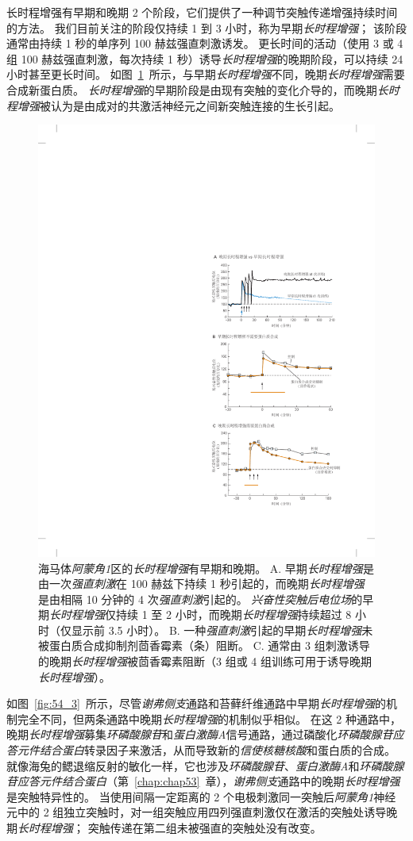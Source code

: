 长时程增强有早期和晚期 2 个阶段，它们提供了一种调节突触传递增强持续时间的方法。
我们目前关注的阶段仅持续 1 到 3 小时，称为早期\textit{长时程增强}；
该阶段通常由持续 1 秒的单序列 100 赫兹强直刺激诱发。
更长时间的活动（使用 3 或 4 组 100 赫兹强直刺激，每次持续 1 秒）诱导\textit{长时程增强}的晚期阶段，可以持续 24 小时甚至更长时间。
如图~\ref{fig:54_5}~所示，与早期\textit{长时程增强}不同，晚期\textit{长时程增强}需要合成新蛋白质。
\textit{长时程增强}的早期阶段是由现有突触的变化介导的，而晚期\textit{长时程增强}被认为是由成对的共激活神经元之间新突触连接的生长引起。


\begin{figure}[htbp]
	\centering
	\includegraphics[width=0.65\linewidth]{chap54/fig_54_5}
	\caption{海马体\textit{阿蒙角1}区的\textit{长时程增强}有早期和晚期。
		A. 早期\textit{长时程增强}是由一次\textit{强直刺激}在 100 赫兹下持续 1 秒引起的，而晚期\textit{长时程增强}是由相隔 10 分钟的 4 次\textit{强直刺激}引起的。
		\textit{兴奋性突触后电位场}的早期\textit{长时程增强}仅持续 1 至 2 小时，而晚期\textit{长时程增强}持续超过 8 小时（仅显示前 3.5 小时）。
		B. 一种\textit{强直刺激}引起的早期\textit{长时程增强}未被蛋白质合成抑制剂茴香霉素（条）阻断。
		C. 通常由 3 组刺激诱导的晚期\textit{长时程增强}被茴香霉素阻断（3 组或 4 组训练可用于诱导晚期\textit{长时程增强}）\cite{huang1994recruitment}。}
	\label{fig:54_5}
\end{figure}


如图~\ref{fig:54_3}~所示，尽管\textit{谢弗侧支}通路和苔藓纤维通路中早期\textit{长时程增强}的机制完全不同，但两条通路中晚期\textit{长时程增强}的机制似乎相似。
在这 2 种通路中，晚期\textit{长时程增强}募集\textit{环磷酸腺苷}和\textit{蛋白激酶A}信号通路，通过磷酸化\textit{环磷酸腺苷应答元件结合蛋白}转录因子来激活，从而导致新的\textit{信使核糖核酸}和蛋白质的合成。
就像海兔的鳃退缩反射的敏化一样，它也涉及\textit{环磷酸腺苷}、\textit{蛋白激酶A}和\textit{环磷酸腺苷应答元件结合蛋白}（第~\ref{chap:chap53}~章），\textit{谢弗侧支}通路中的晚期\textit{长时程增强}是突触特异性的。
当使用间隔一定距离的 2 个电极刺激同一突触后\textit{阿蒙角1}神经元中的 2 组独立突触时，对一组突触应用四列强直刺激仅在激活的突触处诱导晚期\textit{长时程增强}；
突触传递在第二组未被强直的突触处没有改变。


